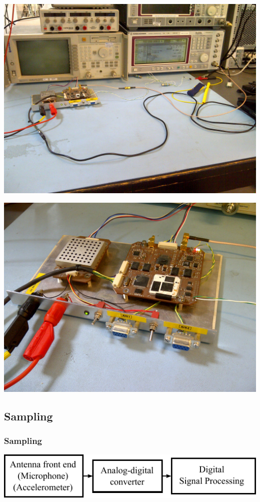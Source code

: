 \begin{frame}[plain]
    \includegraphics[width=0.92\paperwidth]{img/sdr_3}
\end{frame}
\begin{frame}[plain]
    \includegraphics[width=0.92\paperwidth]{img/sdr_2}
\end{frame}


\subsection{Sampling}
\begin{frame}
    \frametitle{Sampling}
    \begin{center}
        \includegraphics{img/sdr_1}
    \end{center}
\end{frame}

